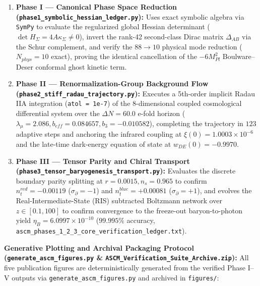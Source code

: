 \documentclass[aps,prd,onecolumn,superscriptaddress,nofootinbib,longbibliography,10pt]{revtex4-2}
\begin{document}
\begin{enumerate}
  
\item \textbf{Phase I — Canonical Phase Space Reduction (\texttt{phase1_symbolic_hessian_ledger.py}):} Uses exact symbolic algebra via \texttt{SymPy} to evaluate the regularized global Hessian determinant (\(\det H_{\Sigma} = 4A\kappa_{\Sigma} \neq 0\)), invert the rank-42 second-class Dirac matrix \(\Delta_{AB}\) via the Schur complement, and verify the \(88 \to 10\) physical mode reduction (\(N_{phys} = 10\) exact), proving the identical cancellation of the \(-6M_{Pl}^2\) Boulware–Deser conformal ghost kinetic term.
  
\item \textbf{Phase II — Renormalization-Group Background Flow (\texttt{phase2_stiff_radau_trajectory.py}):} Executes a 5th-order implicit Radau IIA integration (\texttt{atol = 1e-7}) of the 8-dimensional coupled cosmological differential system over the \(\Delta N = 60.0\) e-fold horizon (\(\lambda_\mu = 2.086, b_{eff} = 0.084657, b_3 = -0.010582\)), completing the trajectory in \(123\) adaptive steps and anchoring the infrared coupling at \(\xi(0) = 1.0003 \times 10^{-6}\) and the late-time dark-energy equation of state at \(w_{DE}(0) = -0.9970\).
  
\item \textbf{Phase III — Tensor Parity and Chiral Transport (\texttt{phase3_tensor_baryogenesis_transport.py}):} Evaluates the discrete boundary parity splitting at \(r = 0.0015, n_s = 0.965\) to confirm \(n_t^{red} = -0.00119\) (\(\sigma_{\partial} = -1\)) and \(n_t^{blue} = +0.00081\) (\(\sigma_{\partial} = +1\)), and evolves the Real-Intermediate-State (RIS) subtracted Boltzmann network over \(z \in [0.1, 100]\) to confirm convergence to the freeze-out baryon-to-photon yield \(\eta_B = 6.0997 \times 10^{-10}\) (\(99.995\%\) accuracy, \texttt{ascm_phases_1_2_3_core_verification_ledger.txt}).

\end{enumerate}



\textbf{Generative Plotting and Archival Packaging Protocol (\texttt{generate_ascm_figures.py} \& \texttt{ASCM_Verification_Suite_Archive.zip}):} All five publication figures are deterministically generated from the verified Phase I–V outputs via \texttt{generate_ascm_figures.py} and archived in \texttt{figures/}:
\end{document}
